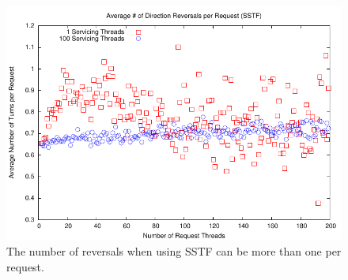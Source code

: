\documentclass{report}
\begin{document}
\begin{figure}[htb!]
    \centering
    \includegraphics[scale=1]{turnsSSTF.pdf}
    \caption{The number of reversals when using SSTF can be more than one per request.}
    \label{fig:turnsSSTF}
\end{figure}


\newpage
\end{document}
